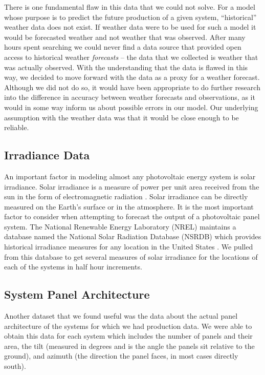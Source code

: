 \documentclass[11pt, fullpage,letterpaper]{article}
\begin{document}
There is one fundamental flaw in this data that we could not solve. For a model whose purpose is to predict the future production of a given system, “historical” weather data does not exist. If weather data were to be used for such a model it would be forecasted weather and not weather that was observed. After many hours spent searching we could never find a data source that provided open access to historical weather \textit{forecasts} – the data that we collected is weather that was actually observed. With the understanding that the data is flawed in this way, we decided to move forward with the data as a proxy for a weather forecast. Although we did not do so, it would have been appropriate to do further research into the difference in accuracy between weather forecasts and observations, as it would in some way inform us about possible errors in our model. Our underlying assumption with the weather data was that it would be close enough to be reliable. 

\FloatBarrier

\subsection{Irradiance Data}

An important factor in modeling almost any photovoltaic energy system is solar irradiance. Solar irradiance is a measure of power per unit area received  from the sun in the form of electromagnetic radiation \cite{nasa}. Solar irradiance can be directly measured on the Earth’s surface or in the atmosphere. It is the most important factor to consider when attempting to forecast the output of a photovoltaic panel system. The National Renewable Energy Laboratory (NREL) maintains a database named the National Solar Radiation Database (NSRDB) which provides historical irradiance measures for any location in the United States \cite{nsrdb}. We pulled from this database to get several measures of solar irradiance for the locations of each of the systems in half hour increments. 

\subsection{System Panel Architecture}

Another dataset that we found useful was the data about the actual panel architecture of the systems for which we had production data. We were able to obtain this data for each system which includes the number of panels and their area, the tilt (measured in degrees and is the angle the panels sit relative to the ground), and azimuth (the direction the panel faces, in most cases directly south). 
\end{document}
